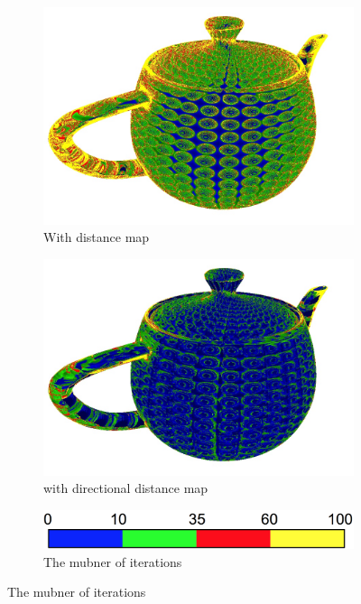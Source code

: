 \begin{figure}
\begin{center}
	\begin{subfigure}[b]{0.45\textwidth}
		\includegraphics[width=1.0\textwidth]{graphics/df/ddm-result-1}	
		\caption{With distance map}
	\end{subfigure}
	\begin{subfigure}[b]{0.45\textwidth}
		\includegraphics[width=1.0\textwidth]{graphics/df/ddm-result-2}	
		\caption{with directional distance map}
	\end{subfigure}
	\begin{subfigure}[b]{0.45\textwidth}
		\includegraphics[width=1.0\textwidth]{graphics/df/ddm-1}	
		\caption{The mubner of iterations}
	\end{subfigure}
\end{center}
\end{figure}

